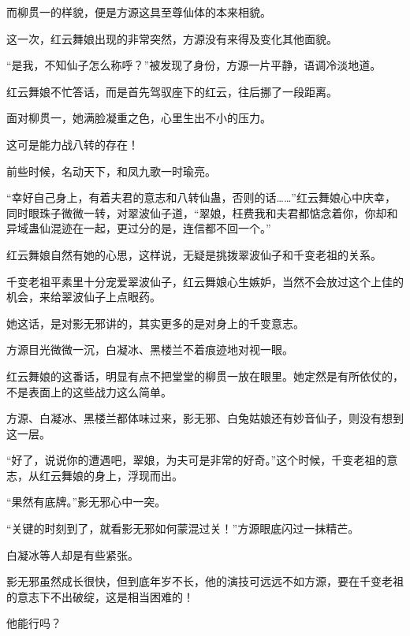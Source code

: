 \begin{this_body}
而柳贯一的样貌，便是方源这具至尊仙体的本来相貌。

这一次，红云舞娘出现的非常突然，方源没有来得及变化其他面貌。

“是我，不知仙子怎么称呼？”被发现了身份，方源一片平静，语调冷淡地道。

红云舞娘不忙答话，而是首先驾驭座下的红云，往后挪了一段距离。

面对柳贯一，她满脸凝重之色，心里生出不小的压力。

这可是能力战八转的存在！

前些时候，名动天下，和凤九歌一时瑜亮。

“幸好自己身上，有着夫君的意志和八转仙蛊，否则的话……”红云舞娘心中庆幸，同时眼珠子微微一转，对翠波仙子道，“翠娘，枉费我和夫君都惦念着你，你却和异域蛊仙混迹在一起，更过分的是，连信都不回一个。”

红云舞娘自然有她的心思，这样说，无疑是挑拨翠波仙子和千变老祖的关系。

千变老祖平素里十分宠爱翠波仙子，红云舞娘心生嫉妒，当然不会放过这个上佳的机会，来给翠波仙子上点眼药。

她这话，是对影无邪讲的，其实更多的是对身上的千变意志。

方源目光微微一沉，白凝冰、黑楼兰不着痕迹地对视一眼。

红云舞娘的这番话，明显有点不把堂堂的柳贯一放在眼里。她定然是有所依仗的，不是表面上的这些战力这么简单。

方源、白凝冰、黑楼兰都体味过来，影无邪、白兔姑娘还有妙音仙子，则没有想到这一层。

“好了，说说你的遭遇吧，翠娘，为夫可是非常的好奇。”这个时候，千变老祖的意志，从红云舞娘的身上，浮现而出。

“果然有底牌。”影无邪心中一突。

“关键的时刻到了，就看影无邪如何蒙混过关！”方源眼底闪过一抹精芒。

白凝冰等人却是有些紧张。

影无邪虽然成长很快，但到底年岁不长，他的演技可远远不如方源，要在千变老祖的意志下不出破绽，这是相当困难的！

他能行吗？

\end{this_body}

